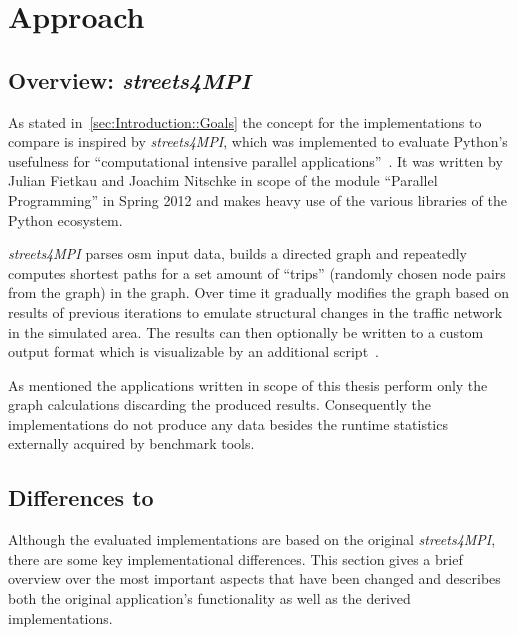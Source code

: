 \chapter{Approach}
\label{ch:Approach}


\section{Overview: \textit{streets4MPI}}
\label{sec:Approach::Overview}

As stated in~\autoref{sec:Introduction::Goals} the concept for the implementations to compare is inspired by \textit{streets4MPI}, which was implemented to evaluate Python's usefulness for ``computational intensive parallel applications''~\cite[p.3]{streets_report}. It was written by Julian Fietkau and Joachim Nitschke in scope of the module ``Parallel Programming'' in Spring 2012 and makes heavy use of the various libraries of the Python ecosystem.

\textit{streets4MPI} parses \gls{osm} input data, builds a directed graph and repeatedly computes shortest paths for a set amount of ``trips'' (randomly chosen node pairs from the graph) in the graph. Over time it gradually modifies the graph based on results of previous iterations to emulate structural changes in the traffic network in the simulated area. The results can then optionally be written to a custom output format which is visualizable by an additional script~\cite{streets_report}.

As mentioned the applications written in scope of this thesis perform only the graph calculations discarding the produced results. Consequently the implementations do not produce any data besides the runtime statistics externally acquired by benchmark tools.

\section{Differences to }
\label{sec:Approach::Differences}

Although the evaluated implementations are based on the original \textit{streets4MPI}, there are some key implementational differences. This section gives a brief overview over the most important aspects that have been changed and describes both the original application's functionality as well as the derived implementations.

